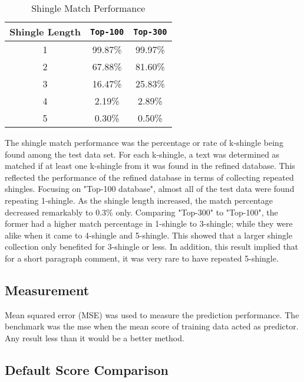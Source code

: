\begin{table}[H]
\caption{Shingle Match Performance}
		\begin{tabular}{ccc}
			\toprule
				Shingle Length & \texttt{Top-100} & \texttt{Top-300} \\
			\midrule
				1 & 99.87\% & 99.97\% \\
				2 & 67.88\% & 81.60\% \\
				3 & 16.47\% & 25.83\% \\
				4 & 2.19\%  & 2.89\% \\
				5 & 0.30\%  & 0.50\% \\
			\bottomrule
		\end{tabular}
\end{table}

The shingle match performance was the percentage or rate of k-shingle being found among the test data set. 
For each k-shingle, a text was determined as matched if at least one k-shingle from it was found in the refined database. 
This reflected the performance of the refined database in terms of collecting repeated shingles. 
Focusing on "Top-100 database", almost all of the test data were found repeating 1-shingle. As the shingle length increased, the match percentage decreased remarkably to 0.3\% only. 
Comparing "Top-300" to "Top-100", the former had a higher match percentage in 1-shingle to 3-shingle; while they were alike when it came to 4-shingle and 5-shingle.
This showed that a larger shingle collection only benefited for 3-shingle or less. In addition, this result implied that for a short paragraph comment, it was very rare to have repeated 5-shingle. 

\subsection{Measurement}
Mean squared error (MSE) was used to measure the prediction performance. The benchmark was the mse when the mean score of training data acted as predictor. Any result less than it would be a better method.

\subsection{Default Score Comparison}

